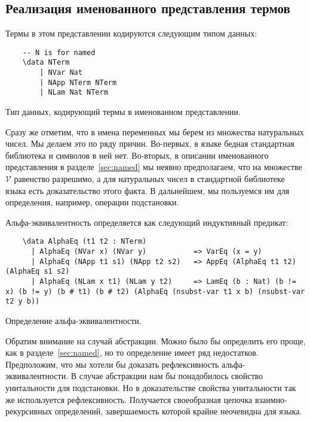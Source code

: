 \subsection{Реализация именованного представления термов}

Термы в этом представлении кодируются следующим типом данных:
\begin{listing}[H]
  \begin{verbatim}
    -- N is for named
    \data NTerm
        | NVar Nat
        | NApp NTerm NTerm
        | NLam Nat NTerm
  \end{verbatim}
  \caption{Тип данных, кодирующий термы в именованном представлении.}
\end{listing}

Сразу же отметим, что в имена переменных мы берем из множества натуральных чисел. Мы делаем это по ряду причин. Во-первых, в языке бедная стандартная библиотека и символов в ней нет. Во-вторых, в описании именованного представления в разделе~\ref{sec:named} мы неявно предполагаем, что на множестве $\mathcal{V}$ равенство разрешимо, а для натуральных чисел в стандартной библиотеке языка есть доказательство этого факта. В дальнейшем, мы пользуемся им для определения, например, операции подстановки.

Альфа-эквивалентность определяется как следующий индуктивный предикат:
\begin{listing}[H]
  \begin{verbatim}
    \data AlphaEq (t1 t2 : NTerm)
      | AlphaEq (NVar x) (NVar y)           => VarEq (x = y)
      | AlphaEq (NApp t1 s1) (NApp t2 s2)   => AppEq (AlphaEq t1 t2) (AlphaEq s1 s2)
      | AlphaEq (NLam x t1) (NLam y t2)     => LamEq (b : Nat) (b != x) (b != y) (b # t1) (b # t2) (AlphaEq (nsubst-var t1 x b) (nsubst-var t2 y b))
  \end{verbatim}
  \caption{Определение альфа-эквивалентности.}
\end{listing}

Обратим внимание на случай абстракции. Можно было бы определить его проще, как в разделе~\ref{sec:named}, но то определение имеет ряд недостатков. Предположим, что мы хотели бы доказать рефлексивность альфа-эквивалентности. В случае абстракции нам бы понадобилось свойство унитальности для подстановки. Но в доказательстве свойства унитальности так же используется рефлексивность. Получается своеобразная цепочка взаимно-рекурсивных определений, завершаемость которой крайне неочевидна для языка.

